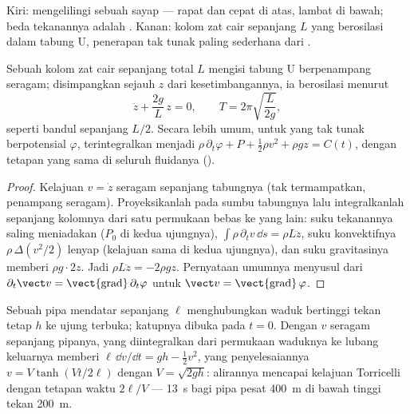 \begin{omfigure}
{\small Kiri:  mengelilingi sebuah sayap --- rapat dan cepat di
atas, lambat di bawah; beda tekanannya adalah . Kanan:
kolom zat cair sepanjang $L$ yang berosilasi dalam tabung U, penerapan
tak tunak paling sederhana dari .}
\end{omfigure}

\begin{proposition}\label{prop:b2:euler-bernoulli:utube}
Sebuah kolom zat cair sepanjang total $L$ mengisi tabung U berpenampang
seragam; disimpangkan sejauh $z$ dari kesetimbangannya, ia berosilasi menurut
\[
\ddot z + \frac{2g}{L}\,z = 0 , \qquad T = 2\pi\sqrt{\frac{L}{2g}} ,
\]
seperti bandul sepanjang $L/2$. Secara lebih umum, untuk  yang tak tunak berpotensial $\varphi$,  terintegralkan menjadi
$\rho\,\partial_t\varphi + P + \tfrac12\rho v^2 + \rho gz = C(t)$, dengan tetapan
yang sama di seluruh fluidanya ().
\end{proposition}

\begin{proof}
Kelajuan $v = \dot z$ seragam sepanjang tabungnya (tak termampatkan,
penampang seragam). Proyeksikanlah  pada sumbu tabungnya lalu
integralkanlah sepanjang kolomnya dari satu permukaan bebas ke yang lain:
suku tekanannya saling meniadakan ($P_0$ di kedua ujungnya),
$\int\rho\,\partial_tv\,\dd s = \rho L\ddot z$, suku konvektifnya
$\rho\,\Delta(v^2/2)$ lenyap (kelajuan sama di kedua ujungnya), dan suku
gravitasinya memberi $\rho g\cdot2z$. Jadi $\rho L\ddot z = -2\rho gz$.
Pernyataan umumnya menyusul dari $\partial_t\vect v = \operatorname{\vect{grad}}
\partial_t\varphi$ untuk $\vect v = \operatorname{\vect{grad}}\varphi$.
\end{proof}

\begin{example}\label{ex:b2:euler-bernoulli:start}
Sebuah pipa mendatar sepanjang $\ell$ menghubungkan waduk bertinggi
tekan tetap $h$ ke ujung terbuka; katupnya dibuka pada $t = 0$. Dengan $v$ seragam
sepanjang pipanya,  yang diintegralkan dari permukaan waduknya ke
lubang keluarnya memberi $\ell\,\dd v/\dd t = gh - \tfrac12v^2$, yang penyelesaiannya
$v = V\tanh(Vt/2\ell)$ dengan $V = \sqrt{2gh}$: alirannya mencapai kelajuan
Torricelli dengan tetapan waktu $2\ell/V$ --- \qty{13}{s} bagi pipa pesat \qty{400}{m}
di bawah tinggi tekan \qty{200}{m}.
\end{example}


